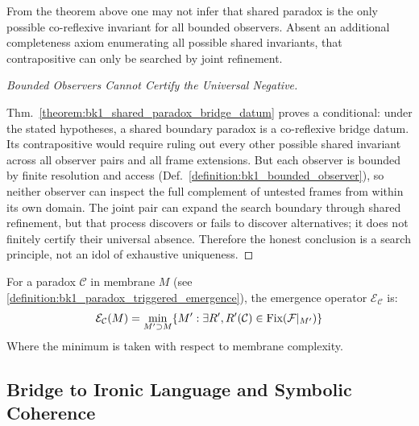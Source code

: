 \begin{corollary}
\label{corollary:bk1_contrapositive_search_principle}
From the theorem above one may not infer that shared paradox is the only
possible co-reflexive invariant for all bounded observers. Absent an additional
completeness axiom enumerating all possible shared invariants, that
contrapositive can only be searched by joint refinement.
\end{corollary}
\begin{proof}[Bounded Observers Cannot Certify the Universal Negative]
\label{proof:bk1_contrapositive_search_principle}
\leavevmode

Thm.~\ref{theorem:bk1_shared_paradox_bridge_datum} proves a conditional: under
the stated hypotheses, a shared boundary paradox is a co-reflexive bridge datum.
Its contrapositive would require ruling out every other possible shared
invariant across all observer pairs and all frame extensions. But each observer
is bounded by finite resolution and access
(Def.~\ref{definition:bk1_bounded_observer}), so neither observer can inspect the
full complement of untested frames from within its own domain. The joint pair can
expand the search boundary through shared refinement, but that process discovers
or fails to discover alternatives; it does not finitely certify their universal
absence. Therefore the honest conclusion is a search principle, not an idol of
exhaustive uniqueness.
\end{proof}

\begin{definition}
\label{definition:bk1_emergence_operator}
For a paradox $\mathcal{C}$ in membrane $M$ (see \ref{definition:bk1_paradox_triggered_emergence}), the emergence operator $\mathcal{E}_{\mathcal{C}}$ is:
\[
\mathcal{E}_{\mathcal{C}}(M) = \min_{M' \supset M} \{M' : \exists R', R'(\mathcal{C}) \in \text{Fix}(\mathcal{F}|_{M'})\}
\]
Where the minimum is taken with respect to membrane complexity.
\end{definition}

\subsection{Bridge to Ironic Language and Symbolic Coherence}
\label{subsec:bk1_bridge_to_ironic_language_and_symbolic_coherence}

